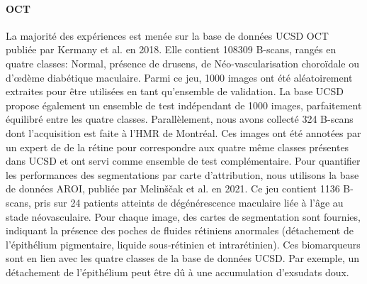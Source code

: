 \paragraph{OCT} La majorité des expériences est menée sur la base de données UCSD \ac{OCT} publiée par Kermany et al. \cite{kermanyIdentifyingMedicalDiagnoses2018} en 2018. Elle contient 108309 B-scans, rangés en quatre classes: Normal, présence de drusens, de Néo-vascularisation choroïdale ou d'\oe dème  diabétique maculaire. Parmi ce jeu, 1000 images ont été aléatoirement extraites pour être utilisées en tant qu'ensemble de validation. La base UCSD propose également un ensemble de test indépendant de 1000 images, parfaitement équilibré entre les quatre classes. Parallèlement, nous avons collecté 324 B-scans dont l'acquisition est faite à l'\ac{HMR} de Montréal. Ces images ont été annotées par un expert de de la rétine pour correspondre aux quatre même classes présentes dans UCSD et ont servi comme ensemble de test complémentaire. Pour quantifier les performances des segmentations par carte d'attribution, nous utilisons la base de données AROI, publiée par Melinščak et al.\cite{melinscakAnnotatedRetinalOptical2021} en 2021. Ce jeu contient 1136 B-scans, pris sur 24 patients atteints de dégénérescence maculaire liée à l'âge au stade néovasculaire. Pour chaque image, des cartes de segmentation sont fournies, indiquant la présence des poches de fluides rétiniens anormales (détachement de l'épithélium pigmentaire, liquide sous-rétinien et intrarétinien). Ces biomarqueurs sont en lien avec les quatre classes de la base de données UCSD. Par exemple, un détachement de l'épithélium peut être dû à une accumulation d'exsudats doux. \\
